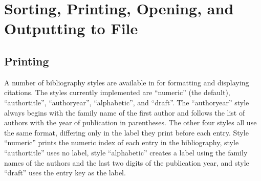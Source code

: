 \documentclass[article]{jss}\usepackage[]{graphicx}\usepackage[]{color}
\newcommand{\ourpkg}{\pkg{RefManageR}}
\begin{document}
\section{Sorting, Printing, Opening, and Outputting to File}
\subsection{Printing}
A number of \Biblatex{} bibliography styles are available in \ourpkg{} for formatting and displaying citations.  The styles currently implemented are ``numeric'' (the default), ``authortitle'', ``authoryear'', ``alphabetic'', and ``draft''.  The ``authoryear'' style always begins with the family name of the first author and follows the list of authors with the year of publication in parentheses.  The other four styles all use the same format, differing only in the label they print before each entry.  Style ``numeric'' prints the numeric index of each entry in the bibliography, style ``authortitle'' uses no label, style ``alphabetic'' creates a label using the family names of the authors and the last two digits of the publication year, and style ``draft'' uses the entry key as the label.
\end{document}
